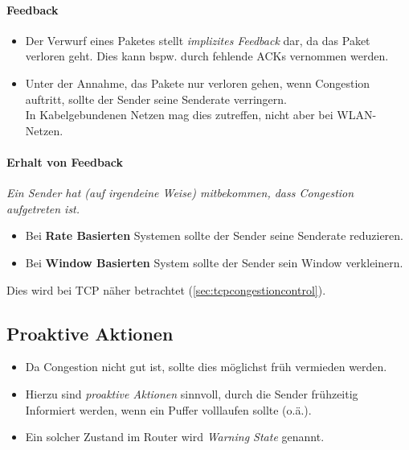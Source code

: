 			\paragraph{Feedback}
				\begin{itemize}
					\item Der Verwurf eines Paketes stellt \textit{implizites Feedback} dar, da das Paket verloren geht. Dies kann bspw. durch fehlende ACKs vernommen werden.
					\item Unter der Annahme, das Pakete nur verloren gehen, wenn Congestion auftritt, sollte der Sender seine Senderate verringern. \\ In Kabelgebundenen Netzen mag dies zutreffen, nicht aber bei WLAN-Netzen.
				\end{itemize}


			\paragraph{Erhalt von Feedback}
				\textit{Ein Sender hat (auf irgendeine Weise) mitbekommen, dass Congestion aufgetreten ist.}

				\begin{itemize}
					\item Bei \textbf{Rate Basierten} Systemen sollte der Sender seine Senderate reduzieren.
					\item Bei \textbf{Window Basierten} System sollte der Sender sein Window verkleinern.
				\end{itemize}

				Dies wird bei TCP näher betrachtet (\ref{sec:tcpcongestioncontrol}).

		\subsection{Proaktive Aktionen}
			\begin{itemize}
				\item Da Congestion nicht gut ist, sollte dies möglichst früh vermieden werden.
				\item Hierzu sind \textit{proaktive Aktionen} sinnvoll, durch die Sender frühzeitig Informiert werden, wenn ein Puffer volllaufen sollte (o.ä.).
				\item Ein solcher Zustand im Router wird \textit{Warning State} genannt.
			\end{itemize}

